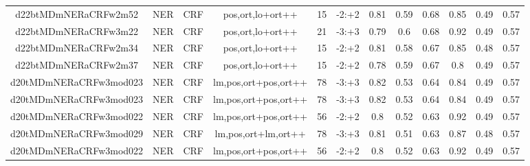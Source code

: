 \documentclass[a4paper]{article}
\begin{document}
\begin{landscape}
\begin{center}
\begin{tabular}{ |c|c|c|c|c|c|c|c|c|c|c|c|}
 	
 
 	
 		
 		\small{ d22btMDmNERaCRFw2m52 } & NER & CRF & pos,ort,lo+ort++  &  15 &  -2:+2  &  0.81 & 0.59 & 0.68  &  0.85 & 0.49 & 0.57 \\
 		

 	
 
 	
 		
 		\small{ d22btMDmNERaCRFw3m22 } & NER & CRF & pos,ort,lo+ort++  &  21 &  -3:+3  &  0.79 & 0.6 & 0.68  &  0.92 & 0.49 & 0.57 \\
 		

 	
 
 	
 		
 		\small{ d22btMDmNERaCRFw2m34 } & NER & CRF & pos,ort,lo+ort++  &  15 &  -2:+2  &  0.81 & 0.58 & 0.67  &  0.85 & 0.48 & 0.57 \\
 		

 	
 
 	
 		
 		\small{ d22btMDmNERaCRFw2m37 } & NER & CRF & pos,ort,lo+ort++  &  15 &  -2:+2  &  0.78 & 0.59 & 0.67  &  0.8 & 0.49 & 0.57 \\
 		

 	
 
 	
 		
 		\small{ d20tMDmNERaCRFw3mod023 } & NER & CRF & lm,pos,ort+pos,ort++  &  78 &  -3:+3  &  0.82 & 0.53 & 0.64  &  0.84 & 0.49 & 0.57 \\
 		

 	
 
 	
 		
 		\small{ d20tMDmNERaCRFw3mod023 } & NER & CRF & lm,pos,ort+pos,ort++  &  78 &  -3:+3  &  0.82 & 0.53 & 0.64  &  0.84 & 0.49 & 0.57 \\
 		

 	
 
 	
 		
 		\small{ d20tMDmNERaCRFw3mod022 } & NER & CRF & lm,pos,ort+pos,ort++  &  56 &  -2:+2  &  0.8 & 0.52 & 0.63  &  0.92 & 0.49 & 0.57 \\
 		

 	
 
 	
 		
 		\small{ d20tMDmNERaCRFw3mod029 } & NER & CRF & lm,pos,ort+lm,ort++  &  78 &  -3:+3  &  0.81 & 0.51 & 0.63  &  0.87 & 0.48 & 0.57 \\
 		

 	
 
 	
 		
 		\small{ d20tMDmNERaCRFw3mod022 } & NER & CRF & lm,pos,ort+pos,ort++  &  56 &  -2:+2  &  0.8 & 0.52 & 0.63  &  0.92 & 0.49 & 0.57 \\
 		

\end{tabular}
\end{center}
\end{landscape}
\end{document}
